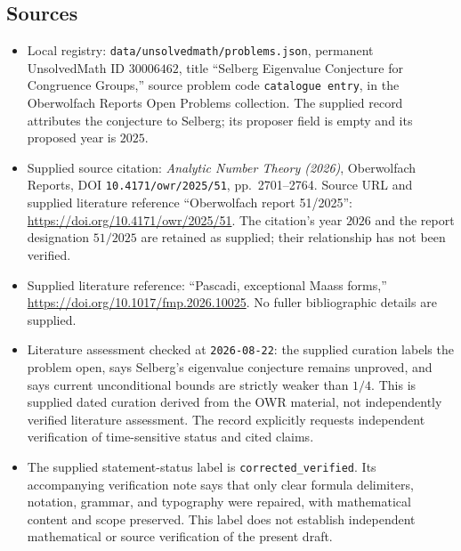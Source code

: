 \documentclass[11pt]{article}
\begin{document}
\subsection{Sources}
\begin{itemize}
\item Local registry: \texttt{data/unsolvedmath/problems.json}, permanent UnsolvedMath ID \(30006462\), title ``Selberg Eigenvalue Conjecture for Congruence Groups,'' source problem code \texttt{catalogue entry}, in the Oberwolfach Reports Open Problems collection. The supplied record attributes the conjecture to Selberg; its proposer field is empty and its proposed year is \(2025\).
\item Supplied source citation: \emph{Analytic Number Theory (2026)}, Oberwolfach Reports, DOI \texttt{10.4171/owr/2025/51}, pp.\ 2701--2764. Source URL and supplied literature reference ``Oberwolfach report 51/2025'': \url{https://doi.org/10.4171/owr/2025/51}. The citation's year \(2026\) and the report designation \(51/2025\) are retained as supplied; their relationship has not been verified.
\item Supplied literature reference: ``Pascadi, exceptional Maass forms,'' \url{https://doi.org/10.1017/fmp.2026.10025}. No fuller bibliographic details are supplied.
\item Literature assessment checked at \texttt{2026-08-22}: the supplied curation labels the problem open, says Selberg's eigenvalue conjecture remains unproved, and says current unconditional bounds are strictly weaker than \(1/4\). This is supplied dated curation derived from the OWR material, not independently verified literature assessment. The record explicitly requests independent verification of time-sensitive status and cited claims.
\item The supplied statement-status label is \texttt{corrected\_verified}. Its accompanying verification note says that only clear formula delimiters, notation, grammar, and typography were repaired, with mathematical content and scope preserved. This label does not establish independent mathematical or source verification of the present draft.
\end{itemize}
\end{document}
